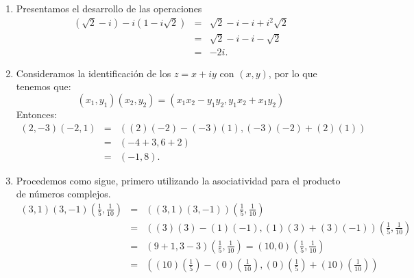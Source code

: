 \documentclass[twoside]{book}
\begin{document}
\begin{sol}
    \begin{solucion}{}
        \begin{enumerate}[label=\alph*).]
            \item Presentamos el desarrollo de las operaciones
                  \begin{eqnarray*}
                      (\sqrt{2}-i)-i(1-i\sqrt{2}) & = & \sqrt{2} - i - i+i^2 \sqrt{2}\\
                      & = & \sqrt{2} - i - i- \sqrt{2}\\
                      & = & -2i.
                  \end{eqnarray*}
            \item Consideramos  la identificaci\'on de los $z=x+iy$  con $(x,y)$, por lo que tenemos que:
                  \begin{equation}\label{eq:ww}
                      \left(x_1,y_1\right)\left(x_2,y_2\right) = \left(x_1 x_2 - y_1 y_2 , y_1 x_2 + x_1 y_2\right)
                  \end{equation}
                  Entonces:
                  \begin{eqnarray*}
                      \left(2,-3\right)\left(-2,1\right) & = & \left(\left(2\right)\left(-2\right) - \left(-3\right)\left(1\right) , \left(-3\right)\left(-2\right) + \left(2\right)\left(1\right) \right)\\
                      & = & \left(-4 +3,6 + 2\right)\\
                      & = & \left(-1,8\right).
                  \end{eqnarray*}
            \item Procedemos como sigue, primero utilizando la asociatividad para el producto de n\'umeros complejos.
                  \begin{eqnarray*}
                      \displaystyle(3,1)(3,-1)\left(\frac{1}{5},\frac{1}{10}\right) &=&\displaystyle\left((3,1)(3,-1)\right)\left(\frac{1}{5},\frac{1}{10}\right)\\
                      & = & \left( (3)(3) - (1)(-1),(1)(3) + (3)(-1) \right)\left(\frac{1}{5},\frac{1}{10}\right)\\
                      & = & (9+1,3-3)\left(\frac{1}{5},\frac{1}{10}\right)= (10,0)\left(\frac{1}{5},\frac{1}{10}\right)\\
                      & = & \left((10)\left(\frac{1}{5}\right) - (0)\left(\frac{1}{10}\right),(0)\left(\frac{1}{5}\right) + (10) \left(\frac{1}{10}\right)\right)\\

\end{eqnarray*}
\end{enumerate}
\end{solucion}
\end{sol}
\end{document}
